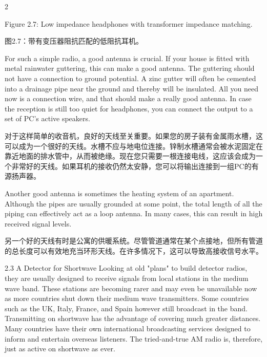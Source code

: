 \documentclass{ctexbook}
\begin{document}
\begin{paracol}{2}
\switchcolumn*

Figure 2.7: Low impedance headphones with transformer impedance matching. 

\switchcolumn

图2.7：带有变压器阻抗匹配的低阻抗耳机。

\switchcolumn*

For such a simple radio, a good antenna is crucial. If your house is fitted with metal rainwater guttering, this can make a good antenna. The guttering should not have a connection to 
ground potential. A zinc gutter will often be cemented into a drainage pipe near the ground 
and thereby will be insulated. All you need now is a connection wire, and that should make 
a really good antenna. In case the reception is still too quiet for headphones, you can connect the output to a set of PC's active speakers. 

\switchcolumn

对于这样简单的收音机，良好的天线至关重要。如果您的房子装有金属雨水槽，这可以成为一个很好的天线。水槽不应与地电位连接。锌制水槽通常会被水泥固定在靠近地面的排水管中，从而被绝缘。现在您只需要一根连接电线，这应该会成为一个非常好的天线。如果耳机的接收仍然太安静，您可以将输出连接到一组PC的有源扬声器。

\switchcolumn*

Another good antenna is sometimes the heating system of an apartment. Although the 
pipes are usually grounded at some point, the total length of all the piping can effectively 
act as a loop antenna. In many cases, this can result in high received signal levels. 

\switchcolumn

另一个好的天线有时是公寓的供暖系统。尽管管道通常在某个点接地，但所有管道的总长度可以有效地充当环形天线。在许多情况下，这可以导致高接收信号水平。

\switchcolumn*

2.3 A Detector for Shortwave 
Looking at old "plans" to build detector radios, they are usually designed to receive signals 
from local stations in the medium wave band. These stations are becoming rarer and may 
even be unavailable now as more countries shut down their medium wave transmitters. 
Some countries such as the UK, Italy, France, and Spain however still broadcast in the 
band. Transmitting on shortwave has the advantage of covering much greater distances. 
Many countries have their own international broadcasting services designed to inform and 
entertain overseas listeners. The tried-and-true AM radio is, therefore, just as active on 
shortwave as ever. 


\end{paracol}
\end{document}
